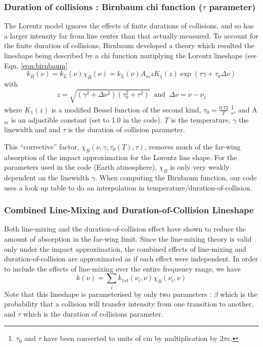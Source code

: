 \documentclass[11pt]{article}
\begin{document}
\subsubsection{Duration of collisions : Birnbaum chi function ($\tau$ 
parameter)}
The Lorentz model ignores the effects of finite durations of collisions, and
so has a larger intensity far from line center than that actually measured. 
To account for the finite duration of collisions, Birnbaum developed a 
theory which resulted the lineshape being described by a chi function 
mutiplying the Lorentz lineshape (see Eqn. \ref{eqn:birnbaum} 
\[
k_{B}(\nu)=k_{L}(\nu)\chi_{B}(\nu)=k_{L}(\nu) A_{m} z K_{1}(z)\exp\left(
\tau\gamma+\tau_{0}\Delta\nu\right)
\]
with
\[
z=\sqrt{(\gamma^{2}+\Delta\nu^{2})(\tau_{0}^{2}+\tau^{2})}
\; \; \mbox{and} \; \;
\Delta\nu=\nu-\nu_{j}
\]
where $K_{1}(z)$ is a modified Bessel function of the second kind, 
$\tau_{0}=\frac{0.72}{T}$ \footnote{$\tau_{0}$ and $\tau$ have been
converted to units of $\mbox{cm}$ by multiplication by $2\pi\mbox{c}$.}, 
and A$_{m}$ is an adjustible constant (set to 1.0 in the code).  $T$ is the 
temperature, $\gamma$ the linewidth and and $\tau$ is the duration of 
collision parameter.

This ``corrective'' factor, $\chi_{B}(\nu,\gamma,\tau_{0}(T),\tau)$, 
removes much of the far-wing absorption of the impact approximation for the 
Lorentz line shape. For the parameters used in the code (Earth atmosphere),
$\chi_{B}$ is only very weakly dependent on the linewidth $\gamma$.  
When computing the Birnbaum function, our code uses a look up table to do 
an interpolation in temperature/duration-of-collision.

\subsubsection{Combined Line-Mixing and Duration-of-Collision Lineshape}
Both line-mixing and the duration-of-collision effect have shown to reduce
the amount of absorption in the far-wing limit.  Since the line-mixing
theory is valid only under the impact approximation, the combined effects
of line-mixing and duration-of-collision are approximated as if each
effect were independent.  In order to include the effects of line-mixing
over the entire frequency range, we have 
\[
k(\nu)=\sum_i k_{1st}(\nu_i,\nu)\chi_{B}(\nu_i,\nu)
\]
Note that this lineshape is parameterised by only two parameters : $\beta$ 
which is the probability that a collision will transfer intensity from one 
transition to another, and $\tau$ which is the duration of collisions 
parameter.
\end{document}
